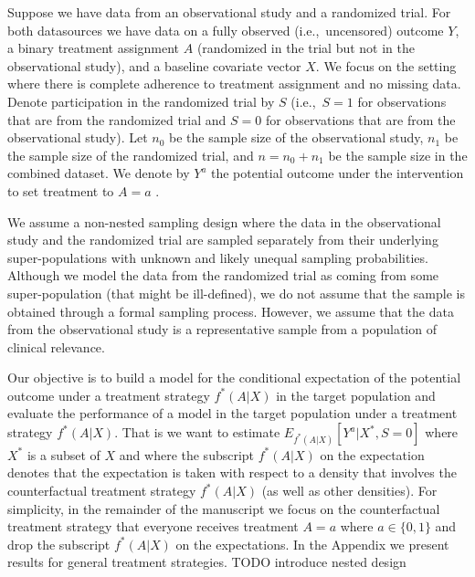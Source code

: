 \documentclass[11pt]{article}
\begin{document}
Suppose we have data from an observational study and a randomized trial. For both datasources we have data on a fully observed (i.e.,~uncensored) outcome $Y$, a binary treatment assignment $A$ (randomized in the trial but not in the observational study), and a baseline covariate vector $X$. We focus on the setting where there is complete adherence to treatment assignment and no missing data. Denote participation in the randomized trial by $S$ (i.e.,~$S=1$ for observations that are from the randomized trial and $S=0$ for observations that are from the observational study). Let $n_0$ be the sample size of the observational study, $n_1$ be the sample size of the randomized trial, and $n = n_0 + n_1$ be the sample size in the combined dataset. We denote by $Y^a$ the potential outcome under the intervention to set treatment to $A=a$ \cite{rubin1974,robins2000d}. 

We assume a non-nested sampling design \cite{dahabreh2021study} where the data in the observational study and the randomized trial are sampled separately from their underlying super-populations with unknown and likely unequal sampling probabilities. Although we model the data from the randomized trial as coming from some super-population (that might be ill-defined), we do not assume that the sample is obtained through a formal sampling process. However, we assume that the data from the observational study is a representative sample from a population of clinical relevance.


Our objective is to build a model for the conditional expectation of the potential outcome under a treatment strategy $f^*(A|X)$ in the target population and evaluate the performance of a model in the target population under a treatment strategy $f^*(A|X)$. That is we want to estimate $E_{f^*(A|X)}[Y^a|X^*, S=0]$ where $X^*$ is a subset of $X$ and where the subscript $f^*(A|X)$ on the expectation denotes that the expectation is taken with respect to a density that involves the counterfactual treatment strategy $f^*(A|X)$ (as well as other densities). For simplicity, in the remainder of the manuscript we focus on the counterfactual treatment strategy that everyone receives treatment $A=a$ where  $a \in \{0,1\}$ and drop the subscript $f^*(A|X)$ on the expectations. In the Appendix we present results for general treatment strategies. 
TODO introduce nested design

\end{document}
